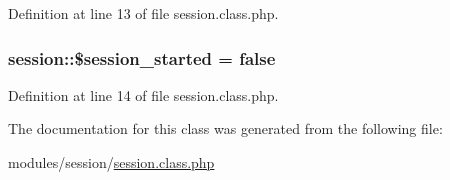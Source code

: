 Definition at line 13 of file session.\+class.\+php.

\hypertarget{classsession_aae3391920555707a71e14e15f2929825}{}
\subsubsection[{\$session\+\_\+started}]{\setlength{\rightskip}{0pt plus 5cm}session\+::\$session\+\_\+started = false}\label{classsession_aae3391920555707a71e14e15f2929825}


Definition at line 14 of file session.\+class.\+php.



The documentation for this class was generated from the following file\+:\begin{DoxyCompactItemize}
\item 
modules/session/\hyperlink{session_8class_8php}{session.\+class.\+php}\end{DoxyCompactItemize}

